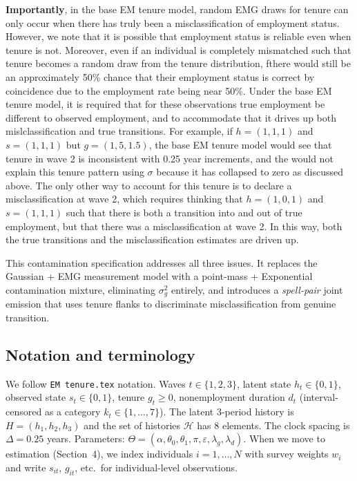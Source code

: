 \textbf{Importantly}, in the base EM tenure model,
random EMG draws for tenure can only occur when there has truly been a misclassification
of employment status. However, we note that it is possible that employment status is reliable
even when tenure is not. Moreover, even if an individual is completely mismatched such
that tenure becomes a random draw from the tenure distribution, fthere would still be an
approximately 50\% chance that their employment status is correct by coincidence due 
to the employment rate being near 50\%. Under the base EM tenure model, it is required that
for these observations true employment be different to observed employment, and to accommodate
that it drives up both mislclassification and true transitions. For example, if \(h=(1,1,1)\) 
and \(s=(1,1,1)\) but \(g=(1, 5, 1.5)\), the base EM tenure model would see that 
tenure in wave 2 is inconsistent with 0.25 year increments, and the would not explain this
tenure pattern using \(\sigma\) because it has collapsed to zero as discussed above. The only
other way to account for this tenure is to declare a misclassification at wave 2, 
which requires thinking that \(h=(1,0,1)\) and \(s=(1,1,1)\) such that there is both a transition into
and out of true employment, but that there was a misclassification at wave 2. In this way, 
both the true transitions and the misclassification estimates are driven up.

This contamination specification addresses all three issues. 
It replaces the Gaussian + EMG measurement
model with a point-mass + Exponential contamination mixture, eliminating
\(\sigma_g^2\) entirely, and introduces a \emph{spell-pair} joint emission
that uses tenure flanks to discriminate misclassification from genuine
transition.

\subsection{Notation and terminology}

We follow \texttt{EM tenure.tex} notation.
Waves \(t \in \{1,2,3\}\), latent state \(h_{t} \in \{0,1\}\), observed
state \(s_{t} \in \{0,1\}\), tenure \(g_{t} \ge 0\), nonemployment
duration \(d_{t}\) (interval-censored as a category \(k_{t} \in \{1,\dots,7\}\)).
The latent 3-period history is \(H = (h_{1},h_{2},h_{3})\)
and the set of histories \(\mathcal{H}\) has 8 elements. The clock spacing
is \(\Delta = 0.25\) years. Parameters: \(\Theta = (\alpha,\theta_0,\theta_1,\pi,\varepsilon,\lambda_g,\lambda_d)\).
When we move to estimation (Section~4), we index individuals
\(i = 1,\dots,N\) with survey weights \(w_i\) and write
\(s_{it}\), \(g_{it}\), etc.\ for individual-level observations.

